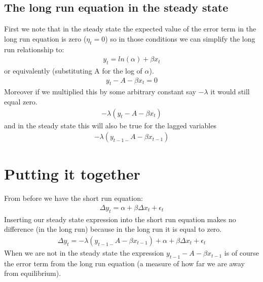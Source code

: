 \documentclass[letterpaper,10pt,english]{jupyterBook}
\begin{document}
\subsection{The long run equation in the steady state}
\label{\detokenize{content/06_WBModels/LoadingWBModel:the-long-run-equation-in-the-steady-state}}
\sphinxAtStartPar
First we note that in the steady state the expected value of the error term in the long run equation is zero (\(\eta_t=0 \)) so in those conditions we can simplify the long run relationship to:
\begin{equation*}
\begin{split}y_t=ln⁡(α)+\beta x_t\end{split}
\end{equation*}
\sphinxAtStartPar
or equivalently (substituting A for the log of \(\alpha\)).
\begin{equation*}
\begin{split}y_t-A-βx_t=0\end{split}
\end{equation*}
\sphinxAtStartPar
Moreover if we multiplied this by some arbitrary constant say \(-\lambda\) it would still equal zero.
\begin{equation*}
\begin{split}-\lambda(y_t -A-βx_t)\end{split}
\end{equation*}
\sphinxAtStartPar
and in the steady state this will also be true for the lagged variables
\begin{equation*}
\begin{split}-\lambda(y_{t-1-} A - βx_{t-1})\end{split}
\end{equation*}

\section{Putting it together}
\label{\detokenize{content/06_WBModels/LoadingWBModel:putting-it-together}}
\sphinxAtStartPar
From before we have the short run equation:
\begin{equation*}
\begin{split}\Delta y_t = \alpha + \beta \Delta x_t +\epsilon_t\end{split}
\end{equation*}
\sphinxAtStartPar
Inserting our steady state expression into the short run equation makes no difference (in the long run) because in the long run it is equal to zero.
\begin{equation*}
\begin{split}\Delta y_t = -\lambda(y_{t-1-}A-βx_{t-1})  + \alpha + \beta \Delta x_t +\epsilon_t\end{split}
\end{equation*}
\sphinxAtStartPar
When we are not in the steady state the expression \(y_{t-1}-A-βx_{t-1}\) is of course the error term from the long run equation (a measure of how far we are away from equilibrium).
\end{document}

